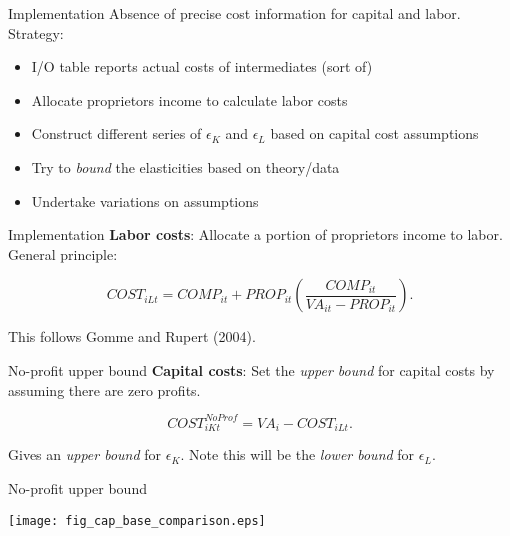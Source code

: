 \documentclass[10pt,xcolor=dvipsnames]{beamer}
\begin{document}
\begin{frame}{Implementation}\label{Smakeuse}
Absence of precise cost information for capital and labor. Strategy:

\begin{itemize}
  \item I/O table reports actual costs of intermediates (sort of)
  \item Allocate proprietors income to calculate labor costs
  \item Construct different series of $\epsilon_K$ and $\epsilon_L$ based on capital cost assumptions
  \item Try to \textit{bound} the elasticities based on theory/data
  \item Undertake variations on assumptions
\end{itemize}
\vspace{.25in} \hfill \hyperlink{Amakeuse}{}
\end{frame}

\begin{frame}{Implementation}
\textbf{Labor costs}: Allocate a portion of proprietors income to labor. General principle:

\begin{equation}
  COST_{iLt} = COMP_{it} + PROP_{it}\left(\frac{COMP_{it}}{VA_{it}-PROP_{it}}\right).
\end{equation}

This follows Gomme and Rupert (2004).

\end{frame}

\begin{frame}{No-profit upper bound}
\textbf{Capital costs}: Set the \textit{upper bound} for capital costs by assuming there are zero profits.

\begin{equation}
  COST_{iKt}^{NoProf} = VA_i - COST_{iLt}.
\end{equation}

Gives an \textit{upper bound} for $\epsilon_K$. Note this will be the \textit{lower bound} for $\epsilon_L$.

\end{frame}

\begin{frame}{No-profit upper bound}
\begin{center}
\texttt{[image: fig\_cap\_base\_comparison.eps]}
\end{center}
\end{frame}
\end{document}
